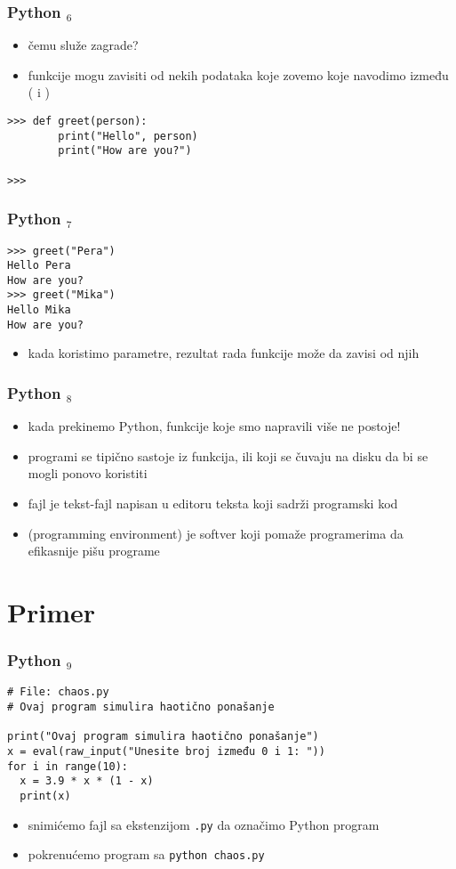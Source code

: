 \documentclass[utf8,compress]{beamer}
\begin{document}
\begin{frame}[fragile]
\frametitle{Python $_6$}
\begin{itemize}
  \item čemu služe zagrade?
  \item funkcije mogu zavisiti od nekih podataka koje zovemo  koje navodimo između ( i )
\end{itemize}
\begin{verbatim}
>>> def greet(person):
        print("Hello", person)
        print("How are you?")

>>>
\end{verbatim}
\end{frame}

\begin{frame}[fragile]
\frametitle{Python $_7$}
\begin{verbatim}
>>> greet("Pera")
Hello Pera
How are you?
>>> greet("Mika")
Hello Mika
How are you?
\end{verbatim}
\begin{itemize}
  \item kada koristimo parametre, rezultat rada funkcije može da zavisi od njih
\end{itemize}
\end{frame}

\begin{frame}[fragile]
\frametitle{Python $_8$}
\begin{itemize}
  \item kada prekinemo Python, funkcije koje smo napravili više ne postoje!
  \item programi se tipično sastoje iz funkcija,  ili  koji se čuvaju na disku da bi se mogli ponovo koristiti
  \item {} fajl je tekst-fajl napisan u editoru teksta koji sadrži programski kod
  \item {} (programming environment) je softver koji pomaže programerima da efikasnije pišu programe
\end{itemize}
\end{frame}

\section{Primer}

\begin{frame}[fragile]
\frametitle{Python $_9$}
\begin{verbatim}
# File: chaos.py
# Ovaj program simulira haotično ponašanje

print("Ovaj program simulira haotično ponašanje")
x = eval(raw_input("Unesite broj između 0 i 1: "))
for i in range(10):
  x = 3.9 * x * (1 - x)
  print(x)
\end{verbatim}
\begin{itemize}
  \item snimićemo fajl sa ekstenzijom \texttt{.py} da označimo Python program
  \item pokrenućemo program sa \texttt{python chaos.py}
\end{itemize}
\end{frame}
\end{document}
